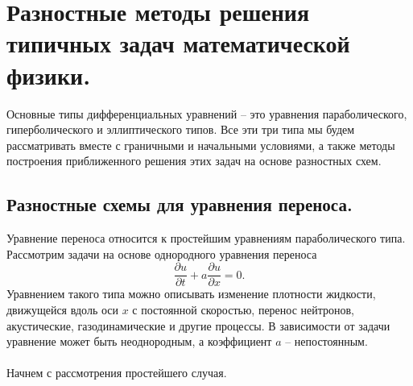 \documentclass[a4paper, 12pt]{report}
\numberwithin{equation}{section}
\renewcommand{\d}{\partial}
\begin{document}
 \chapter{Разностные методы решения типичных задач математической физики.}
 Основные типы дифференциальных уравнений -- это уравнения параболического, гиперболического и эллиптического типов. Все эти три типа мы будем рассматривать вместе с граничными и начальными условиями, а также методы построения приближенного решения этих задач на основе разностных схем.
 \section{Разностные схемы для уравнения переноса.}
 Уравнение переноса относится к простейшим уравнениям параболического типа. Рассмотрим задачи на основе однородного уравнения переноса
 $$\dfrac{\d u}{\d t}+ a \dfrac{\d u}{\d x} = 0.$$
 Уравнением такого типа можно описывать изменение плотности жидкости, движущейся вдоль оси $x$ с постоянной скоростью, перенос нейтронов, акустические, газодинамические и другие процессы. В зависимости от задачи уравнение может быть неоднородным, а коэффициент $a$ -- непостоянным.\\\\
 Начнем с рассмотрения простейшего случая.
\end{document}

